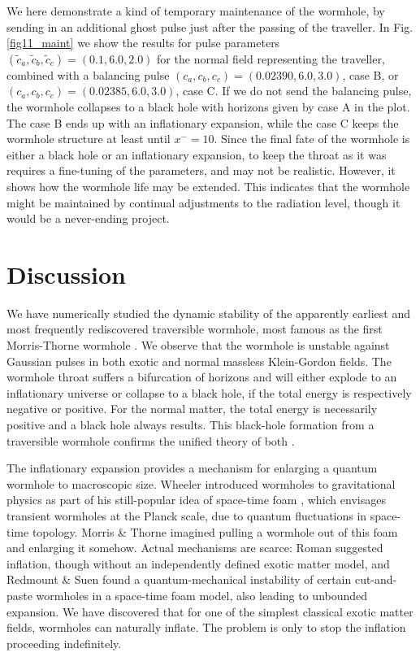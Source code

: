 \documentclass[aps,showpacs,twocolumn,draft,eqsecnum]{revtex4}
\begin{document}
We here demonstrate a kind of temporary maintenance of the wormhole, by sending
in an additional ghost pulse just after the passing of the traveller. In
Fig.\ref{fig11_maint} we show the results for pulse parameters $(\tilde{c}_a,
\tilde{c}_b, \tilde{c}_c)=(0.1, 6.0, 2.0)$ for the normal field representing
the traveller, combined with a balancing pulse $(c_a, c_b, c_c)=(0.02390, 6.0,
3.0)$, case B, or $(c_a, c_b, c_c)=(0.02385, 6.0, 3.0)$, case C. If we do not
send the balancing pulse, the wormhole collapses to a black hole with horizons
given by case A in the plot. The case B ends up with an inflationary expansion,
while the case C keeps the wormhole structure at least until $x^-=10$. Since
the final fate of the wormhole is either a black hole or an inflationary
expansion, to keep the throat as it was requires a fine-tuning of the
parameters, and may not be realistic. However, it shows how the wormhole life
may be extended. This indicates that the wormhole might be maintained by
continual adjustments to the radiation level, though it would be a never-ending
project.

\section{Discussion}\label{sec4}
We have numerically studied the dynamic stability of the apparently earliest
\cite{E} and most frequently rediscovered \cite{wh,Cl} traversible wormhole,
most famous as the first Morris-Thorne wormhole \cite{MT}. We observe that the
wormhole is unstable against Gaussian pulses in both exotic and normal massless
Klein-Gordon fields. The wormhole throat suffers a bifurcation of horizons and
will either explode to an inflationary universe or collapse to a black hole, if
the total energy is respectively negative or positive. For the normal matter,
the total energy is necessarily positive and a black hole always results. This
black-hole formation from a traversible wormhole confirms the unified theory of
both \cite{wh}.

The inflationary expansion provides a mechanism for enlarging a quantum
wormhole to macroscopic size. Wheeler introduced wormholes to gravitational
physics as part of his still-popular idea of space-time foam \cite{W}, which
envisages transient wormholes at the Planck scale, due to quantum fluctuations
in space-time topology. Morris \& Thorne imagined pulling a wormhole out of
this foam and enlarging it somehow. Actual mechanisms are scarce: Roman
\cite{R} suggested inflation, though without an independently defined exotic
matter model, and Redmount \& Suen \cite{RS} found a quantum-mechanical
instability of certain cut-and-paste wormholes in a space-time foam model, also
leading to unbounded expansion. We have discovered that for one of the simplest
classical exotic matter fields, wormholes can naturally inflate. The problem is
only to stop the inflation proceeding indefinitely.
\end{document}
